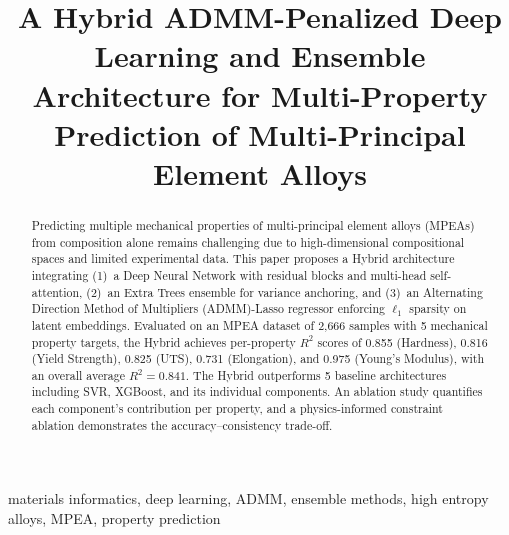 \documentclass[conference]{IEEEtran}
\begin{document}
\title{A Hybrid ADMM-Penalized Deep Learning and Ensemble Architecture for Multi-Property Prediction of Multi-Principal Element Alloys}

\author{}

\maketitle

\begin{abstract}
Predicting multiple mechanical properties of multi-principal element alloys (MPEAs) from composition alone remains challenging due to high-dimensional compositional spaces and limited experimental data. This paper proposes a Hybrid architecture integrating (1)~a Deep Neural Network with residual blocks and multi-head self-attention, (2)~an Extra Trees ensemble for variance anchoring, and (3)~an Alternating Direction Method of Multipliers (ADMM)-Lasso regressor enforcing $\ell_1$ sparsity on latent embeddings. Evaluated on an MPEA dataset of 2,666 samples with 5 mechanical property targets, the Hybrid achieves per-property $R^2$ scores of 0.855 (Hardness), 0.816 (Yield Strength), 0.825 (UTS), 0.731 (Elongation), and 0.975 (Young's Modulus), with an overall average $R^2 = 0.841$. The Hybrid outperforms 5 baseline architectures including SVR, XGBoost, and its individual components. An ablation study quantifies each component's contribution per property, and a physics-informed constraint ablation demonstrates the accuracy--consistency trade-off.
\end{abstract}

\begin{IEEEkeywords}
materials informatics, deep learning, ADMM, ensemble methods, high entropy alloys, MPEA, property prediction
\end{IEEEkeywords}
\end{document}
